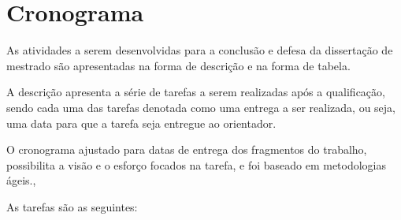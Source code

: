 \chapter{Cronograma}

As atividades a serem desenvolvidas para a 
conclusão e defesa da dissertação de mestrado 
são apresentadas na forma de descrição e na forma de tabela.

A descrição apresenta a série de tarefas 
a serem realizadas após a qualificação, 
sendo cada uma das tarefas denotada como uma entrega a ser realizada, 
ou seja, uma data para que a tarefa seja entregue ao orientador.

O cronograma ajustado para datas de entrega dos fragmentos do trabalho,
 possibilita a visão e o esforço focados na tarefa, 
e foi baseado em metodologias ágeis.,  


As tarefas são as seguintes:


